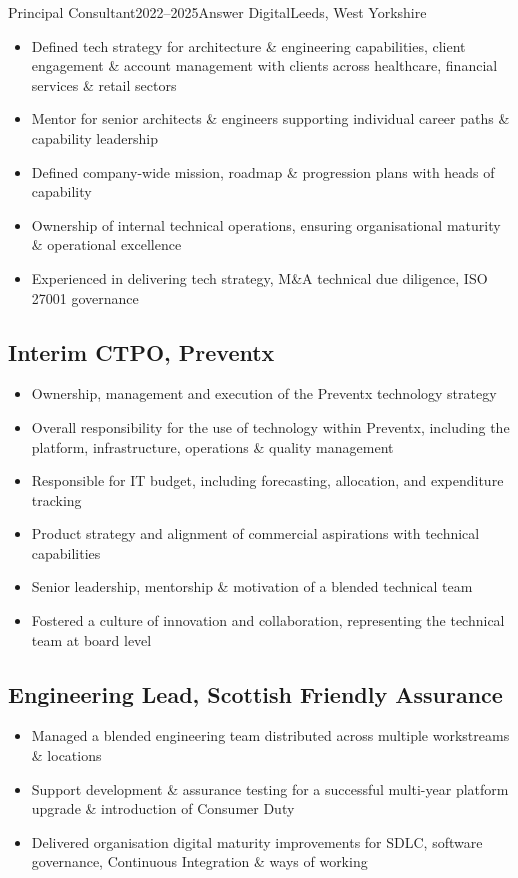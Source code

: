 \documentclass{cv}
\begin{document}
\begin{experienceplain}{Principal Consultant}{2022--2025}{Answer Digital}{Leeds, West Yorkshire}
\begin{itemize}
\item Defined tech strategy for architecture \& engineering capabilities, client engagement \&
      account management with clients across healthcare, financial services \& retail sectors
\item Mentor for senior architects \& engineers supporting individual career paths \& capability leadership
\item Defined company-wide mission, roadmap \& progression plans with heads of capability
\item Ownership of internal technical operations, ensuring organisational maturity \& operational excellence
\item Experienced in delivering tech strategy, M\&A technical due diligence, ISO 27001 governance
\end{itemize}

\subsection{Interim CTPO, Preventx}
\begin{itemize}
\item Ownership, management and execution of the Preventx technology strategy
\item Overall responsibility for the use of technology within Preventx, including the platform,
      infrastructure, operations \& quality management
\item Responsible for IT budget, including forecasting, allocation, and expenditure tracking
\item Product strategy and alignment of commercial aspirations with technical capabilities
\item Senior leadership, mentorship \& motivation of a blended technical team
\item Fostered a culture of innovation and collaboration, representing the technical team at board level
\end{itemize}

\subsection{Engineering Lead, Scottish Friendly Assurance}
\begin{itemize}
\item Managed a blended engineering team distributed across multiple workstreams \& locations
\item Support development \& assurance testing for a successful multi-year platform upgrade \&
      introduction of Consumer Duty
\item Delivered organisation digital maturity improvements for SDLC, software governance,
      Continuous Integration \& ways of working
\end{itemize}


\end{experienceplain}
\end{document}
